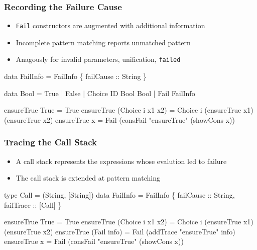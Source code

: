 \documentclass[
,hyperref={pdfpagelabels=false}
,xcolor=dvipsnames
]{beamer}
\begin{document}
\begin{frame}[fragile]%
\frametitle{Recording the Failure Cause}

\begin{itemize}
\item \verb!Fail! constructors are augmented with additional information
\item Incomplete pattern matching reports unmatched pattern
\item Anagously for invalid parameters, unification, \verb!failed!
\end{itemize}

\pause

\begin{haskell}
data FailInfo = FailInfo \{ failCause :: String \}
\end{haskell}

\begin{haskell}
data Bool = True | False | Choice ID Bool Bool | Fail \alert{FailInfo}

ensureTrue True             = True
ensureTrue (Choice i x1 x2) = Choice i (ensureTrue x1)
                                       (ensureTrue x2)
ensureTrue x                = Fail \alert{(consFail "{}ensureTrue" (showCons x))}
\end{haskell}
\end{frame}

\begin{frame}[fragile]%
\frametitle{Tracing the Call Stack}

\begin{itemize}
\item A call stack represents the expressions whose evalution led to failure
\item The call stack is extended at pattern matching
\end{itemize}

\pause

\begin{haskell}
type Call     = (String, [String])
data FailInfo = FailInfo \{ failCause :: String\alert{, failTrace ::  [Call]} \}
\end{haskell}

\begin{haskell}
ensureTrue True             = True
ensureTrue (Choice i x1 x2) = Choice i (ensureTrue x1)
                                       (ensureTrue x2)
\alert{ensureTrue (Fail info)      = Fail (addTrace "{}ensureTrue" info)}
ensureTrue x                = Fail (consFail "{}ensureTrue" (showCons x))
\end{haskell}

\end{frame}
\end{document}
